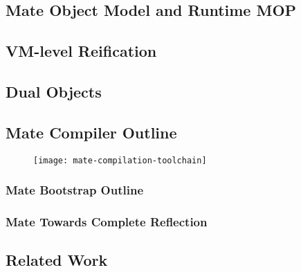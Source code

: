 \subsection{Mate Object Model and Runtime MOP}

\subsection{VM-level Reification}


\subsection{Dual Objects}


\subsection{Mate Compiler Outline}

\begin{figure}[H]
\centering
	\texttt{[image: mate-compilation-toolchain]}
\end{figure}

\subsubsection{Mate Bootstrap Outline}



\subsubsection{Mate Towards Complete Reflection}


\subsection{Related Work}

